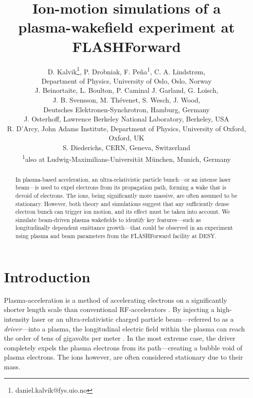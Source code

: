 \documentclass[a4paper,
               biblatex,     %
               ]{jacow}
\begin{document}
\title{Ion-motion simulations of a  \\ plasma-wakefield experiment at FLASHForward}

\author{D. Kalvik\thanks{daniel.kalvik@fys.uio.no}, P. Drobniak, F. Pe\~{n}a\textsuperscript{1}, C. A. Lindstr{\o}m, \\ 
    Department of Physics, University of Oslo, Oslo, Norway \\
        J. Beinortaite, L. Boulton, P. Caminal
        J. Garland, G. Loisch,\\
        J. B. Svensson, M. Thévenet, S. Wesch, J. Wood, \\
        Deutsches Elektronen-Synchrotron, Hamburg, Germany \\
        J. Osterhoff, Lawrence Berkeley National Laboratory, Berkeley, USA \\
        R. D'Arcy, John Adams Institute, Department of Physics, University of Oxford, Oxford, UK\\
        S. Diederichs, CERN, Geneva, Switzerland\\
		\textsuperscript{1}also at Ludwig-Maximilians-Universität München, Munich, Germany}
	
\maketitle


\begin{abstract}
   In plasma-based acceleration, an ultra-relativistic particle bunch---or an intense laser beam---is used to expel electrons from its propagation path, forming a wake that is devoid of electrons. The ions, being significantly more massive, are often assumed to be stationary. However, both theory and simulations suggest that any sufficiently dense electron bunch can trigger ion motion, and its effect must be taken into account. We simulate beam-driven plasma wakefields to identify key features---such as longitudinally dependent emittance growth---that could be observed in an experiment using plasma and beam parameters from the FLASHForward facility at DESY.
\end{abstract}

\section{Introduction}
Plasma-acceleration is a method of accelerating electrons on a significantly shorter length scale than conventional RF-accelerators \cite{TajimaDawson, chen, Ruth:157249}. By injecting a high-intensity laser or an ultra-relativistic charged particle beam---referred to as a \textit{driver}---into a plasma, the longitudinal electric field within the plasma can reach the order of tens of gigavolts per meter \cite{LeemansW.P2006Gebf, LeemansWP2014Mebf, ClaytonChristopherE2007Edo4}. In the most extreme case, the driver completely expels the plasma electrons from its path---creating a bubble void of plasma electrons. The ions however, are often considered stationary due to their mass.
\end{document}
